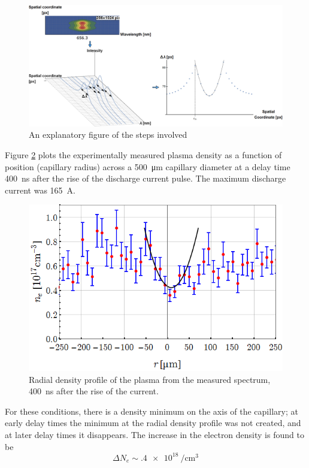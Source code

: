 \documentclass[../main.tex]{subfiles}
\begin{document}
\begin{figure}
    \centering
    \includegraphics[width=\textwidth]{figures/spectro/spectra_analysis.png}
    \caption{An explanatory figure of the steps involved}
    \label{fig:spectra_analysis}
\end{figure}

Figure \ref{fig:plasma_channel_spectro} plots the experimentally measured plasma density as a function of position (capillary radius) across a \SI{500}{\um} capillary diameter at a delay time \SI{400}{\ns} after the rise of the discharge current pulse. The maximum discharge current was \SI{165}{\A}.

\begin{figure}
\centering
\includegraphics[width=\textwidth]{figures/spectro/parabolic.png}
\caption{Radial density profile of the plasma from the measured spectrum, \SI{400}{\ns} after the rise of the current.}
\label{fig:plasma_channel_spectro}
\end{figure}

For these conditions, there is a density minimum on the axis of the capillary; at early delay times the minimum at the radial density profile was not created, and at later delay times it disappears. The increase in the electron density is found to be 
\begin{equation}
    \Delta N_e \sim \SI{.4e18}{\per\cubic\cm}
\end{equation}
\end{document}
